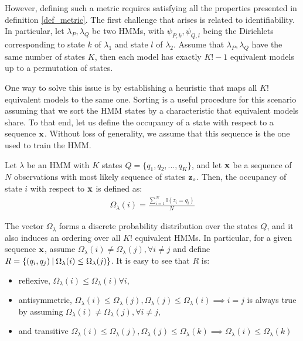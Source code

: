 \documentclass[../main.tex]{subfiles}
\begin{document}
\par However, defining such a metric requires satisfying all the properties presented in definition \ref{def_metric}. The first challenge that arises is related to identifiability. In particular, let $\lambda_P, \lambda_Q$ be two HMMs, with $\psi_{P, k}, \psi_{Q, l}$ being the Dirichlets corresponding to state $k$ of $\lambda_1$ and state $l$ of $\lambda_2$. Assume that $\lambda_P, \lambda_Q$ have the same number of states $K$, then each model has exactly $K!-1$ equivalent models up to a permutation of states. \par One way to solve this issue is by establishing a heuristic that maps all $K!$ equivalent models to the same one. Sorting is a useful procedure for this scenario assuming that we sort the HMM states by a characteristic that equivalent models share. To that end, let us define the occupancy of a state with respect to a sequence $\mathbf{x}$. Without loss of generality, we assume that this sequence is the one used to train the HMM.
\begin{definition}\label{def_occupancy}
Let $\lambda$ be an HMM with $K$ states $Q = \{q_1, q_2, ..., q_K\}$, and let $\mathbf{x}$ be a sequence of $N$ observations with most likely sequence of states $\mathbf{z}_o$. Then, the occupancy of state $i$ with respect to $\mathbf{x}$ is defined as:
\begin{align*}
\Omega_\lambda(i) = \frac{\sum_{i=1}^N\mathbb{I}(z_{i} = q_i)}{N}
\end{align*}
\end{definition}
\par The vector $\Omega_\lambda$ forms a discrete probability distribution over the states $Q$, and it also induces an ordering over all $K!$ equivalent HMMs. In particular, for a given sequence $\mathbf{x}$, assume $\Omega_\lambda(i) \neq \Omega_\lambda(j), \forall i\neq j$ and define $R = \{(q_i, q_j) \:\vert\: \Omega_\lambda(i) \leq \Omega_\lambda(j)\}$. It is easy to see that $R$ is:
\begin{itemize}
\item reflexive, $\Omega_\lambda(i) \leq \Omega_\lambda(i) \forall i$,
\item antisymmetric, $\Omega_\lambda(i) \leq \Omega_\lambda(j), \Omega_\lambda(j) \leq \Omega_\lambda(i) \implies i = j$ is always true by assuming $\Omega_\lambda(i) \neq \Omega_\lambda(j), \forall i\neq j$,
\item and transitive $\Omega_\lambda(i) \leq \Omega_\lambda(j), \Omega_\lambda(j) \leq \Omega_\lambda(k) \implies \Omega_\lambda(i) \leq \Omega_\lambda(k)$
\end{itemize}
\end{document}
